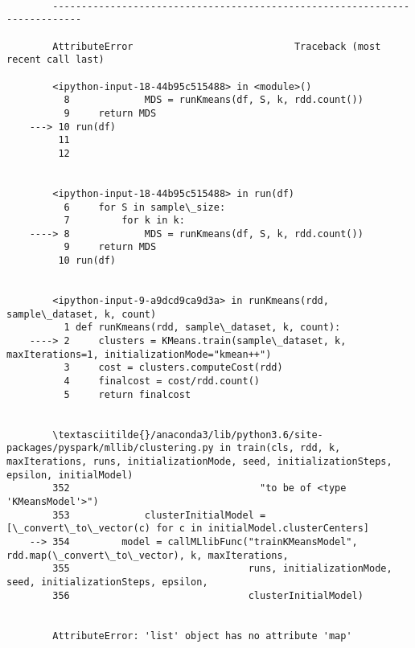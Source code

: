 \documentclass[11pt]{article}
\begin{document}
    \begin{Verbatim}[commandchars=\\\{\}]

        ---------------------------------------------------------------------------

        AttributeError                            Traceback (most recent call last)

        <ipython-input-18-44b95c515488> in <module>()
          8             MDS = runKmeans(df, S, k, rdd.count())
          9     return MDS
    ---> 10 run(df)
         11 
         12 


        <ipython-input-18-44b95c515488> in run(df)
          6     for S in sample\_size:
          7         for k in k:
    ----> 8             MDS = runKmeans(df, S, k, rdd.count())
          9     return MDS
         10 run(df)


        <ipython-input-9-a9dcd9ca9d3a> in runKmeans(rdd, sample\_dataset, k, count)
          1 def runKmeans(rdd, sample\_dataset, k, count):
    ----> 2     clusters = KMeans.train(sample\_dataset, k, maxIterations=1, initializationMode="kmean++")
          3     cost = clusters.computeCost(rdd)
          4     finalcost = cost/rdd.count()
          5     return finalcost


        \textasciitilde{}/anaconda3/lib/python3.6/site-packages/pyspark/mllib/clustering.py in train(cls, rdd, k, maxIterations, runs, initializationMode, seed, initializationSteps, epsilon, initialModel)
        352                                 "to be of <type 'KMeansModel'>")
        353             clusterInitialModel = [\_convert\_to\_vector(c) for c in initialModel.clusterCenters]
    --> 354         model = callMLlibFunc("trainKMeansModel", rdd.map(\_convert\_to\_vector), k, maxIterations,
        355                               runs, initializationMode, seed, initializationSteps, epsilon,
        356                               clusterInitialModel)


        AttributeError: 'list' object has no attribute 'map'

    \end{Verbatim}
\end{document}
